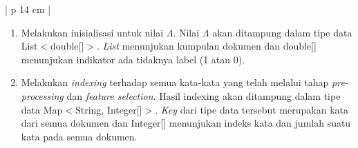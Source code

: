 \begin{enumerate}[nolistsep,leftmargin=0.5cm]
\begin{table}[H]
\small
\centering
\begin{adjustbox}{width=1\textwidth}
\begin{tabular}{| p {14 cm} |}
\hline
\begin{enumerate}[nolistsep,leftmargin=0.7cm]
\item
Melakukan inisialisasi untuk nilai $\Lambda$. Nilai $\Lambda$ akan ditampung dalam tipe data List$<$double[]$>$. {\itshape List} menunjukan kumpulan dokumen dan double[] menunjukan indikator ada tidaknya label (1 atau 0). 
\item
Melakukan {\itshape indexing} terhadap semua kata-kata yang telah melalui tahap {\itshape pre-processing} dan {\itshape feature selection}. Hasil indexing akan ditampung dalam tipe data Map$<$String, Integer[]$>$. {\itshape Key} dari tipe data tersebut merupakan kata dari semua dokumen dan Integer[] menunjukan indeks kata dan jumlah suatu kata pada semua dokumen.
\end{enumerate} \\
\hline
\end{tabular}
\end{adjustbox}
\end{table}


\end{enumerate}
